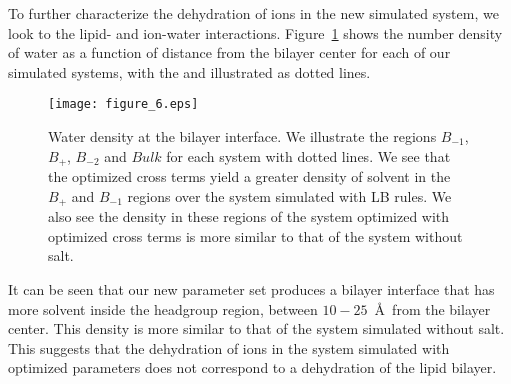 To further characterize the dehydration of ions in the new simulated system, 
we look to the lipid- and ion-water interactions.
Figure~\ref{figch2:waterdens} shows the number density of water as a
function of distance from the bilayer center for each of our simulated
systems, with the \dc{} and \db{} illustrated as dotted lines.  
\begin{figure}[H]
    \caption[Water density at the bilayer interface]{ Water density at the bilayer interface. We illustrate the regions $B_{-1}$, $B_+$, $B_{-2}$ and $Bulk$ for each system with dotted lines.
    We see that the optimized cross terms yield a greater density 
    of solvent in the $B_{+}$ and $B_{-1}$ regions over the system simulated with LB rules. 
We also see the density in these regions of the system optimized
with optimized cross terms is more similar to that of the system without salt.}
    \label{figch2:waterdens}
    \texttt{[image: figure\_6.eps]}
\end{figure}
It can be seen that our new parameter set produces a bilayer
interface that has more solvent inside the headgroup region, 
between $10-25$~\AA~from the bilayer center. 
This density is more similar to that of the system simulated without salt. 
This suggests that the dehydration of ions in the system simulated with optimized parameters
does not correspond to a dehydration of the lipid bilayer.

